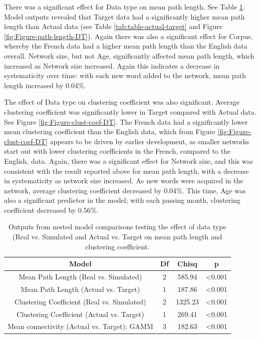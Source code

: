 \documentclass[
  man]{apa6}
\begin{document}
There was a significant effect for Data type on mean path length. See Table \ref{tab:table-model-output}. Model outputs revealed that Target data had a significantly higher mean path length than Actual data (see Table \ref{tab:table-actual-target} and Figure \ref{fig:Figure-path-length-DT}). Again there was also a significant effect for Corpus, whereby the French data had a higher mean path length than the English data overall. Network size, but not Age, significantly affected mean path length, which increased as Network size increased. Again this indicates a decrease in systematicity over time: with each new word added to the network, mean path length increased by 0.04\%.

The effect of Data type on clustering coefficient was also significant. Average clustering coefficient was significantly lower in Target compared with Actual data. See Figure \ref{fig:Figure-clust-coef-DT}. The French data had a significantly lower mean clustering coefficient than the English data, which from Figure \ref{fig:Figure-clust-coef-DT} appears to be driven by earlier development, as smaller networks start out with lower clustering coefficients in the French, compared to the English, data. Again, there was a significant effect for Network size, and this was consistent with the result reported above for mean path length, with a decrease in systematicity as network size increased. As new words were acquired in the network, average clustering coefficient decreased by 0.04\%. This time, Age was also a significant predictor in the model; with each passing month, clustering coefficient decreased by 0.56\%.

\begin{longtable}[t]{cccc}
\caption{\label{tab:table-model-output}Outputs from nested model comparisons testing the effect of data type (Real vs. Simulated and Actual vs. Target on mean path length and clustering coefficient.}\\
\toprule
Model & Df & Chisq & p\\
\midrule
Mean Path Length (Real vs. Simulated) & 2 & 585.94 & <0.001\\
Mean Path Length (Actual vs. Target) & 1 & 187.86 & <0.001\\
Clustering Coefficient (Real vs. Simulated) & 2 & 1325.23 & <0.001\\
Clustering Coefficient (Actual vs. Target) & 1 & 269.41 & <0.001\\
Mean connectivity (Actual vs. Target): GAMM & 3 & 182.63 & <0.001\\
\bottomrule
\end{longtable}
\end{document}
